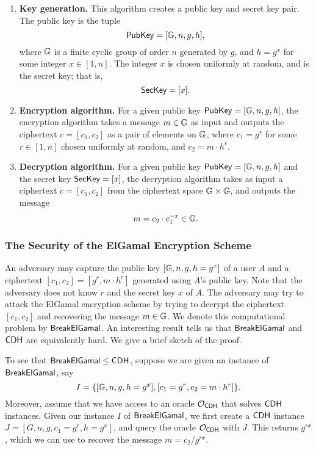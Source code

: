 \begin{enumerate}
    \item {\bf Key generation.} This algorithm creates a public key and secret key 
          pair. The public key is the tuple 
          \[ {\sf PubKey} = [\mathbb{G}, n, g, h], \] 
          where $\mathbb{G}$ is a finite cyclic group of order $n$ generated by $g$, and 
          $h = g^x$ for some integer $x \in [1, n]$. The integer $x$ is chosen 
          uniformly at random, and is the secret key; that is, 
          \[ {\sf SecKey} = [x]. \] 
    \item {\bf Encryption algorithm.} For a given public key ${\sf PubKey} = 
          [\mathbb{G}, n, g, h]$, the encryption algorithm takes a message $m \in \mathbb{G}$ as 
          input and outputs the ciphertext $c = [c_1, c_2]$ as a pair of elements 
          on $\mathbb{G}$, where $c_1 = g^r$ for some $r \in [1, n]$ chosen uniformly 
          at random, and $c_2 = m \cdot h^r$. 
    \item {\bf Decryption algorithm.} For a given public key ${\sf PubKey} = 
          [\mathbb{G}, n, g, h]$ and the secret key ${\sf SecKey} = [x]$, the decryption 
          algorithm takes as input a ciphertext $c = [c_1, c_2]$ from the 
          ciphertext space $\mathbb{G} \times \mathbb{G}$, and outputs the message 
          \[ m = c_2 \cdot c_1^{-x} \in \mathbb{G}. \] 
\end{enumerate}

\subsubsection{The Security of the ElGamal Encryption Scheme}
An adversary may capture the public key $[\mathbb{G}, n, g, h = g^x]$ of a user $A$ 
and a ciphertext $[c_1, c_2] = [g^r, m \cdot h^r]$ generated using $A$'s public 
key. Note that the adversary does not know $r$ and the secret key $x$ of $A$. 
The adversary may try to attack the ElGamal encryption scheme by trying to 
decrypt the ciphertext $[c_1, c_2]$ and recovering the message $m \in \mathbb{G}$. 
We denote this computational problem by ${\sf BreakElGamal}$. An interesting 
result tells us that ${\sf BreakElGamal}$ and ${\sf CDH}$ are equivalently hard. 
We give a brief sketch of the proof. 

To see that ${\sf BreakElGamal} \leq {\sf CDH}$, suppose we are given an instance 
of ${\sf BreakElGamal}$, say 
\[ I = \{[\mathbb{G}, n, g, h = g^x], [c_1 = g^r, c_2 = m \cdot h^r]\}. \] 
Moreover, assume that we have access to an oracle ${\cal O}_{{\sf CDH}}$ that solves 
${\sf CDH}$ instances. Given our instance $I$ of ${\sf BreakElGamal}$, we first create 
a ${\sf CDH}$ instance $J = [G, n, g, c_1 = g^r, h = g^x]$, and query the 
oracle ${\cal O}_{{\sf CDH}}$ with $J$. This returns $g^{rx}$, which we can use 
to recover the message $m = c_2/g^{rx}$. 

